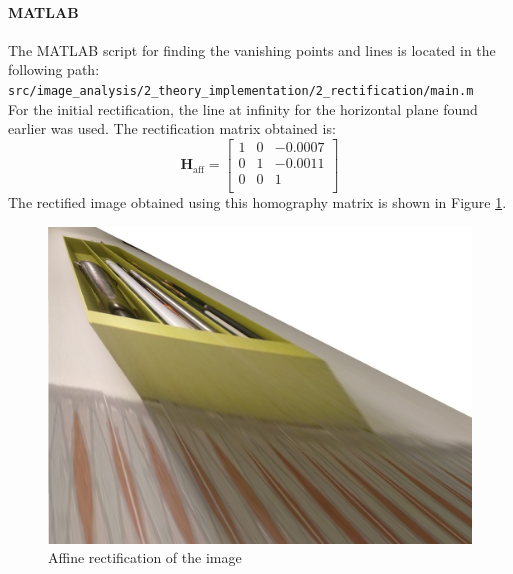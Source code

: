 \documentclass{Academic}
\begin{document}
\paragraph*{MATLAB}
The MATLAB script for finding the vanishing points and lines is located in the following path: \\ 
\texttt{src/image\_analysis/2\_theory\_implementation/2\_rectification/main.m} \\

For the initial rectification, the line at infinity for the horizontal plane found earlier was used. 
The rectification matrix obtained is:
\begin{equation}\mathbf{H}_{\text{aff}} = \begin{bmatrix}
    1 & 0 & -0.0007 \\ 
    0 & 1 & -0.0011 \\ 
    0 & 0 &  1\\ 
\end{bmatrix}\end{equation}
\noindent The rectified image obtained using this homography matrix is shown in Figure \ref{fig:rectified}.
\begin{figure}[!htb]%
    \centering
    \includegraphics[width=0.5\linewidth]{images/rectified.jpg}
    \caption{Affine rectification of the image}
    \label{fig:rectified}
\end{figure}
\end{document}
